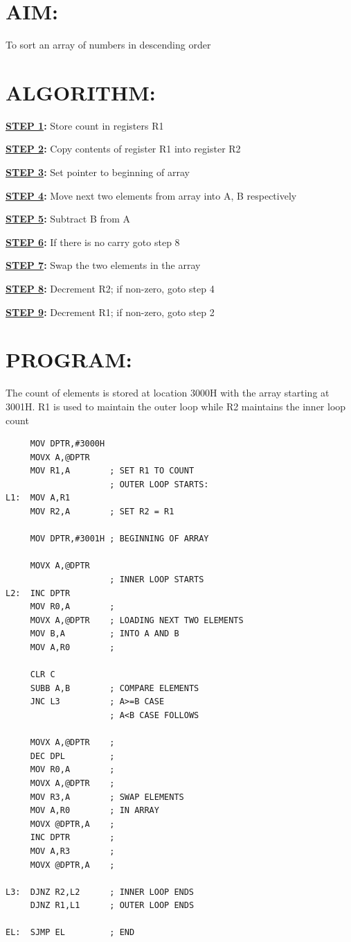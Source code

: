 \documentclass[a4paper,28pt]{report}
\begin{document}
\section*{AIM:}
To sort an array of numbers in descending order

\section*{ALGORITHM:}
\textbf{\underline{STEP 1}:} Store count in registers R1

\textbf{\underline{STEP 2}:} Copy contents of register R1 into register R2

\textbf{\underline{STEP 3}:} Set pointer to beginning of array 

\textbf{\underline{STEP 4}:} Move next two elements from array into A, B respectively

\textbf{\underline{STEP 5}:} Subtract B from A

\textbf{\underline{STEP 6}:} If there is no carry goto step 8

\textbf{\underline{STEP 7}:} Swap the two elements in the array

\textbf{\underline{STEP 8}:} Decrement R2; if non-zero, goto step 4

\textbf{\underline{STEP 9}:} Decrement R1; if non-zero, goto step 2  
\section*{PROGRAM:}
The count of elements is stored at location 3000H with the array starting at 3001H. R1 is used to maintain the outer loop while R2 maintains the inner loop count
\begin{lstlisting}
     MOV DPTR,#3000H
     MOVX A,@DPTR
     MOV R1,A        ; SET R1 TO COUNT
                     ; OUTER LOOP STARTS:
L1:  MOV A,R1
     MOV R2,A        ; SET R2 = R1
     
     MOV DPTR,#3001H ; BEGINNING OF ARRAY
     
     MOVX A,@DPTR
                     ; INNER LOOP STARTS
L2:  INC DPTR 
     MOV R0,A        ;
     MOVX A,@DPTR    ; LOADING NEXT TWO ELEMENTS
     MOV B,A         ; INTO A AND B 
     MOV A,R0        ;
     
     CLR C
     SUBB A,B        ; COMPARE ELEMENTS
     JNC L3          ; A>=B CASE
                     ; A<B CASE FOLLOWS
            
     MOVX A,@DPTR    ;
     DEC DPL         ;
     MOV R0,A        ;
     MOVX A,@DPTR    ; 
     MOV R3,A        ; SWAP ELEMENTS
     MOV A,R0        ; IN ARRAY
     MOVX @DPTR,A    ;
     INC DPTR        ;
     MOV A,R3        ;
     MOVX @DPTR,A    ;
     
L3:  DJNZ R2,L2      ; INNER LOOP ENDS
     DJNZ R1,L1      ; OUTER LOOP ENDS
     
EL:  SJMP EL         ; END
\end{lstlisting}
\end{document}
